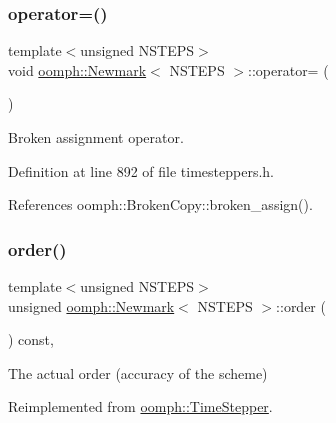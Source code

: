 \mbox{\label{classoomph_1_1Newmark_a549944d9eecd9fe43cd7c81fad571986}} 
\subsubsection{\texorpdfstring{operator=()}{operator=()}}
{\footnotesize\ttfamily template$<$unsigned N\+S\+T\+E\+PS$>$ \\
void \hyperlink{classoomph_1_1Newmark}{oomph\+::\+Newmark}$<$ N\+S\+T\+E\+PS $>$\+::operator= (\begin{DoxyParamCaption}\item[{const \hyperlink{classoomph_1_1Newmark}{Newmark}$<$ N\+S\+T\+E\+PS $>$ \&}]{ }\end{DoxyParamCaption})\hspace{0.3cm}{\ttfamily [inline]}}



Broken assignment operator. 



Definition at line 892 of file timesteppers.\+h.



References oomph\+::\+Broken\+Copy\+::broken\+\_\+assign().

\mbox{\label{classoomph_1_1Newmark_a98d62ea693c8d7a90b6b8273c92c3c75}} 
\subsubsection{\texorpdfstring{order()}{order()}}
{\footnotesize\ttfamily template$<$unsigned N\+S\+T\+E\+PS$>$ \\
unsigned \hyperlink{classoomph_1_1Newmark}{oomph\+::\+Newmark}$<$ N\+S\+T\+E\+PS $>$\+::order (\begin{DoxyParamCaption}{ }\end{DoxyParamCaption}) const\hspace{0.3cm}{\ttfamily [inline]}, {\ttfamily [virtual]}}



The actual order (accuracy of the scheme) 



Reimplemented from \hyperlink{classoomph_1_1TimeStepper_a251e5d4b37381e582b7cf4c554e2e724}{oomph\+::\+Time\+Stepper}.



